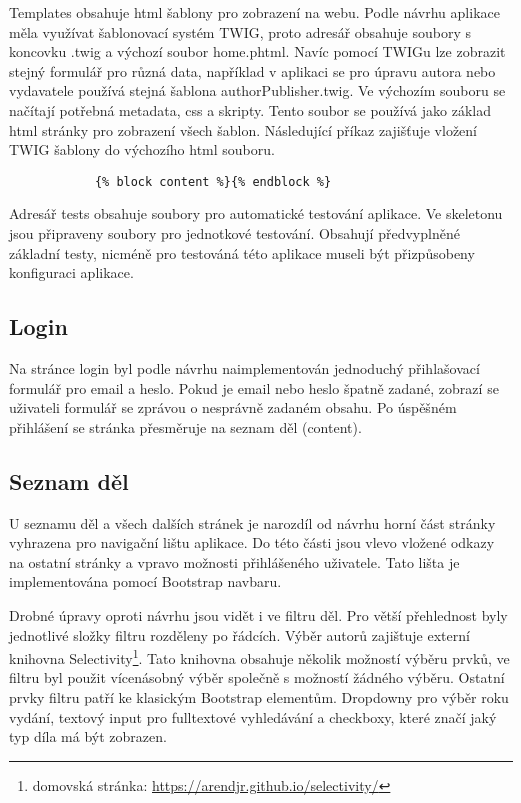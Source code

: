             Templates obsahuje html šablony pro zobrazení na webu. Podle návrhu aplikace měla využívat šablonovací systém TWIG, proto adresář obsahuje soubory s koncovku .twig a výchozí soubor home.phtml. Navíc pomocí TWIGu lze zobrazit stejný formulář pro různá data, například v aplikaci se pro úpravu autora nebo vydavatele používá stejná šablona authorPublisher.twig. Ve výchozím souboru se načítají potřebná metadata, css a skripty. Tento soubor se používá jako základ html stránky pro zobrazení všech šablon. Následující příkaz zajišťuje vložení TWIG šablony do výchozího html souboru. 
            \begin{lstlisting}
            {% block content %}{% endblock %}
            \end{lstlisting}
             
             Adresář tests obsahuje soubory pro automatické testování aplikace. Ve skeletonu jsou připraveny soubory pro jednotkové testování. Obsahují předvyplněné základní testy, nicméně pro testováná této aplikace museli být přizpůsobeny konfiguraci aplikace.
             
        \subsection{Login}
            Na stránce login byl podle návrhu naimplementován jednoduchý přihlašovací formulář pro email a heslo. Pokud je email nebo heslo špatně zadané, zobrazí se uživateli formulář se zprávou o nesprávně zadaném obsahu. Po úspěšném přihlášení se stránka přesměruje na seznam děl (content).
            
        \subsection{Seznam děl}
            U seznamu děl a všech dalších stránek je narozdíl od návrhu horní část stránky vyhrazena pro navigační lištu aplikace. Do této části jsou vlevo vložené odkazy na ostatní stránky a vpravo možnosti přihlášeného uživatele. Tato lišta je implementována pomocí Bootstrap navbaru. 
            
            Drobné úpravy oproti návrhu jsou vidět i ve filtru děl. Pro větší přehlednost byly jednotlivé složky filtru rozděleny po řádcích. Výběr autorů zajištuje externí knihovna Selectivity\footnote{domovská stránka: \url{https://arendjr.github.io/selectivity/}}. Tato knihovna obsahuje několik možností výběru prvků, ve filtru byl použit vícenásobný výběr společně s možností žádného výběru. Ostatní prvky filtru patří ke klasickým Bootstrap elementům. Dropdowny pro výběr roku vydání, textový input pro fulltextové vyhledávání a checkboxy, které značí jaký typ díla má být zobrazen.
            
